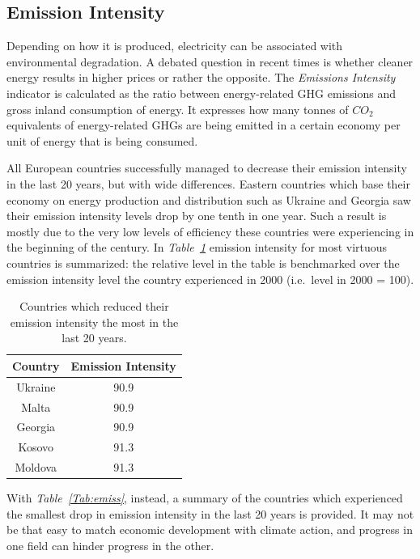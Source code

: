 \documentclass[a4paper,12pt]{book}
\begin{document}
\subsection*{Emission Intensity}

Depending on how it is produced, electricity can be associated with environmental degradation. A debated question in recent times is whether cleaner energy results in higher prices or rather the opposite. The \textit{Emissions Intensity} indicator is calculated as the ratio between energy-related GHG emissions and gross inland consumption of energy. It expresses how many tonnes of $CO_2$ equivalents of energy-related GHGs are being emitted in a certain economy per unit of energy that is being consumed.

All European countries successfully managed to decrease their emission intensity in the last 20 years, but with wide differences. Eastern countries which base their economy on energy production and distribution such as Ukraine and Georgia saw their emission intensity levels drop by one tenth in one year. Such a result is mostly due to the very low levels of efficiency these countries were experiencing in the beginning of the century. In \textit{Table~\ref{Tab:ems}} emission intensity for most virtuous countries is summarized: the relative level in the table is benchmarked over the emission intensity level the country experienced in 2000 (i.e.\ level in 2000 = 100).

\begin{table}[tb]
\begin{center}
\begin{tabular}{|c|c|}
\hline
Country & Emission Intensity \\
\hline
Ukraine & 90.9\\
Malta & 90.9\\
Georgia & 90.9\\
Kosovo & 91.3\\
Moldova & 91.3\\
\hline
\end{tabular}
\caption{Countries which reduced their emission intensity the most in the last 20 years.}
\label{Tab:ems}
\end{center}
\end{table}

With \textit{Table~\ref{Tab:emiss}}, instead, a summary of the countries which experienced the smallest drop in emission intensity in the last 20 years is provided. It may not be that easy to match economic development with climate action, and progress in one field can hinder progress in the other.
\end{document}
